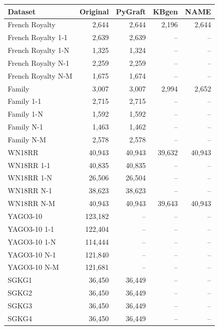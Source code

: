 \begin{tabular}{lrrrr}
\toprule
Dataset & Original & PyGraft & KBgen & NAME \\
\midrule
French Royalty & 2{,}644 & 2{,}644 & 2{,}196 & 2{,}644 \\
French Royalty 1-1 & 2{,}639 & 2{,}639 & – & – \\
French Royalty 1-N & 1{,}325 & 1{,}324 & – & – \\
French Royalty N-1 & 2{,}259 & 2{,}259 & – & – \\
French Royalty N-M & 1{,}675 & 1{,}674 & – & – \\
\midrule
Family & 3{,}007 & 3{,}007 & 2{,}994 & 2{,}652 \\
Family 1-1 & 2{,}715 & 2{,}715 & – & – \\
Family 1-N & 1{,}592 & 1{,}592 & – & – \\
Family N-1 & 1{,}463 & 1{,}462 & – & – \\
Family N-M & 2{,}578 & 2{,}578 & – & – \\
\midrule
WN18RR & 40{,}943 & 40{,}943 & 39{,}632 & 40{,}943 \\
WN18RR 1-1 & 40{,}835 & 40{,}835 & – & – \\
WN18RR 1-N & 26{,}506 & 26{,}504 & – & – \\
WN18RR N-1 & 38{,}623 & 38{,}623 & – & – \\
WN18RR N-M & 40{,}943 & 40{,}943 & 39{,}643 & 40{,}943 \\
\midrule
YAGO3-10 & 123{,}182 & – & – & – \\
YAGO3-10 1-1 & 122{,}404 & – & – & – \\
YAGO3-10 1-N & 114{,}444 & – & – & – \\
YAGO3-10 N-1 & 121{,}840 & – & – & – \\
YAGO3-10 N-M & 121{,}681 & – & – & – \\
\midrule
SGKG1 & 36{,}450 & 36{,}449 & – & – \\
SGKG2 & 36{,}450 & 36{,}449 & – & – \\
SGKG3 & 36{,}450 & 36{,}449 & – & – \\
SGKG4 & 36{,}450 & 36{,}449 & – & – \\
\bottomrule
\end{tabular}
